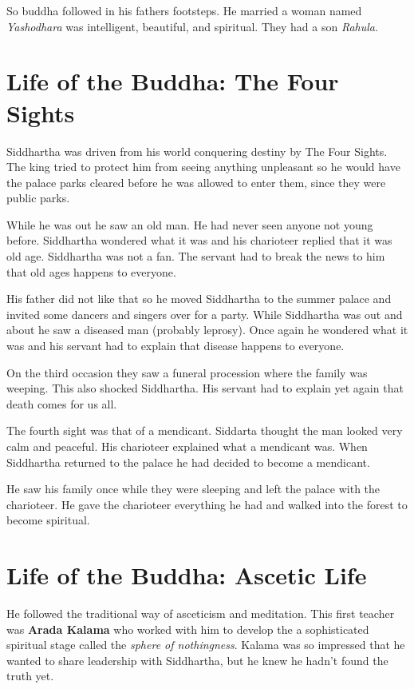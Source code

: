 \documentclass{article}
\begin{document}
So buddha followed in his fathers footsteps. He married a woman named \emph{Yashodhara} was intelligent, beautiful, and spiritual. They had a son \emph{Rahula}.

\section*{Life of the Buddha: The Four Sights}
\label{sec:life_of_the_buddha_the_four_sights}
Siddhartha was driven from his world conquering destiny by The Four Sights. The king tried to protect him from seeing anything unpleasant so he would have the palace parks cleared before he was allowed to enter them, since they were public parks.

While he was out he saw an old man. He had never seen anyone not young before. Siddhartha wondered what it was and his charioteer replied that it was old age. Siddhartha was not a fan. The servant had to break the news to him that old ages happens to everyone.

His father did not like that so he moved Siddhartha to the summer palace and invited some dancers and singers over for a party. While Siddhartha was out and about he saw a diseased man (probably leprosy). Once again he wondered what it was and his servant had to explain that disease happens to everyone.

On the third occasion they saw a funeral procession where the family was weeping. This also shocked Siddhartha. His servant had to explain yet again that death comes for us all.

The fourth sight was that of a mendicant. Siddarta thought the man looked very calm and peaceful. His charioteer explained what a mendicant was. When Siddhartha returned to the palace he had decided to become a mendicant.

He saw his family once while they were sleeping and left the palace with the charioteer. He gave the charioteer everything he had and walked into the forest to become spiritual.

\section*{Life of the Buddha: Ascetic Life}
\label{sec:life_of_the_buddha_ascetic_life}
He followed the traditional way of asceticism and meditation. This first teacher was \textbf{Arada Kalama} who worked with him to develop the a sophisticated spiritual stage called the \emph{sphere of nothingness}. Kalama was so impressed that he wanted to share leadership with Siddhartha, but he knew he hadn't found the truth yet.
\end{document}
